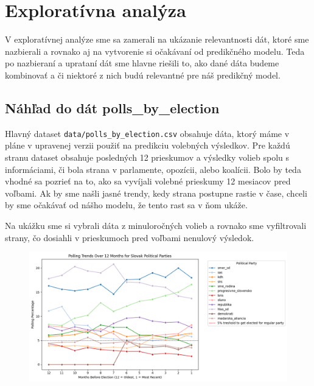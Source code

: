 \documentclass[main.tex]{subfiles}
\begin{document}
\section{Exploratívna analýza}
\label{sec:explore}
V exploratívnej analýze sme sa zamerali na ukázanie relevantnosti dát, ktoré sme nazbierali a rovnako aj na vytvorenie si očakávaní od predikčného modelu. Teda po nazbieraní a uprataní dát sme hlavne riešili to, ako dané dáta budeme kombinovať a či niektoré z nich budú relevantné pre náš predikčný model.

\subsection{Náhľad do dát polls\_by\_election}
Hlavný dataset \verb*|data/polls_by_election.csv| obsahuje dáta, ktorý máme v pláne v upravenej verzii použiť na predikciu volebných výsledkov. Pre každú stranu dataset obsahuje posledných 12 prieskumov a výsledky volieb spolu s informáciami, či bola strana v parlamente, opozícii, alebo koalícii. Bolo by teda vhodné sa pozrieť na to, ako sa vyvíjali volebné prieskumy 12 mesiacov pred voľbami. Ak by sme našli jasné trendy, kedy strana postupne rastie v čase, chceli by sme očakávať od nášho modelu, že tento rast sa v ňom ukáže. 

Na ukážku sme si vybrali dáta z minuloročných volieb a rovnako sme vyfiltrovali strany, čo dosiahli v prieskumoch pred voľbami nenulový výsledok. 

\begin{figure}[!htbp]
    \centering
    \includegraphics[width=\textwidth]{images_exploratory/Polls_without_result_2023.png}
    \caption{}
\end{figure}
\end{document}
